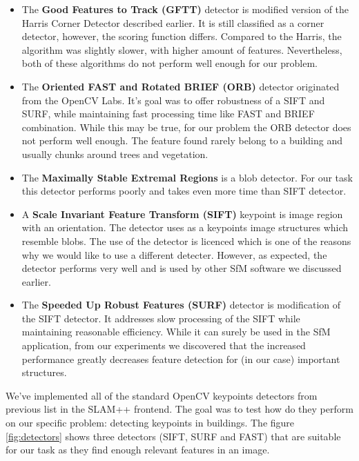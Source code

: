 \begin{itemize}
	\item The \textbf{Good Features to Track (GFTT)} detector is modified version of the Harris Corner Detector described earlier. It is still classified as a corner detector, however, the scoring function differs. Compared to the Harris, the algorithm was slightly slower, with higher amount of features. Nevertheless, both of these algorithms do not perform well enough for our problem. \cite{article:gftt}
	
	\item The \textbf{Oriented FAST and Rotated BRIEF (ORB)} detector originated from the OpenCV Labs. It's goal was to offer robustness of a SIFT and SURF, while maintaining fast processing time like FAST and BRIEF combination. While this may be true, for our problem the ORB detector does not perform well enough. The feature found rarely belong to a building and usually chunks around trees and vegetation. \cite{www:orb}\cite{article:orb}
	
	\item The \textbf{Maximally Stable Extremal Regions} is a blob detector. For our task this detector performs poorly and takes even more time than SIFT detector.
	
	\item A \textbf{Scale Invariant Feature Transform (SIFT)} keypoint is image region with an orientation. The detector uses as a keypoints image structures  which resemble blobs. The use of the detector is licenced which is one of the reasons why we would like to use a different detecter. However, as expected, the detector performs very well and is used by other SfM software we discussed earlier. \cite{article:sift}
	
	\item The \textbf{Speeded Up Robust Features (SURF)} detector is modification of the SIFT detector. It addresses slow processing of the SIFT while maintaining reasonable efficiency. While it can surely be used in the SfM application, from our experiments we discovered that the increased performance greatly decreases feature detection for (in our case) important structures.  \cite{www:surf}
\end{itemize}

We've implemented all of the standard OpenCV keypoints detectors from previous list in the SLAM++ frontend. The goal was to test how do they perform on our specific problem: detecting keypoints in buildings. The figure \ref{fig:detectors} shows three detectors (SIFT, SURF and FAST) that are suitable for our task as they find enough relevant features in an image. 

